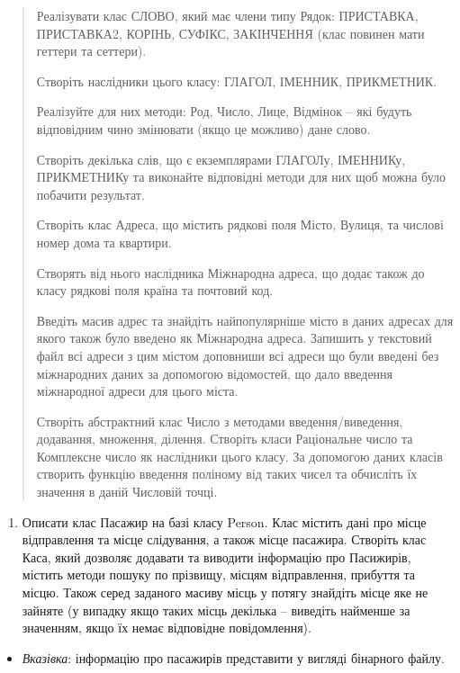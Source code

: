\documentclass[]{article}
\begin{document}
\begin{quote}
\protect\hypertarget{_Hlk65951544}{}{}Реалізувати клас СЛОВО, який має
члени типу Рядок: ПРИСТАВКА, ПРИСТАВКА2, КОРІНЬ, СУФІКС, ЗАКІНЧЕННЯ
(клас повинен мати геттери та сеттери).

Створіть наслідники цього класу: ГЛАГОЛ, ІМЕННИК, ПРИКМЕТНИК.

Реалізуйте для них методи: Род, Число, Лице, Відмінок -- які будуть
відповідним чино змінювати (якщо це можливо) дане слово.

Створіть декілька слів, що є екземплярами ГЛАГОЛу, ІМЕННИКу, ПРИКМЕТНИКу
та виконайте відповідні методи для них щоб можна було побачити
результат.

Створіть клас Адреса, що містить рядкові поля Місто, Вулиця, та числові
номер дома та квартири.

Створять від нього наслідника Міжнародна адреса, що додає також до класу
рядкові поля країна та почтовий код.

Введіть масив адрес та знайдіть найпопулярніше місто в даних адресах для
якого також було введено як Міжнародна адреса. Запишить у текстовий файл
всі адреси з цим містом доповниши всі адреси що були введені без
міжнародних даних за допомогою відомостей, що дало введення міжнародної
адреси для цього міста.

Створіть абстрактний клас Число з методами введення/виведення,
додавання, множення, ділення. Створіть класи Раціональне число та
Комплексне число як наслідники цього класу. За допомогою даних класів
створить функцію введення поліному від таких чисел та обчисліть їх
значення в даній Числовій точці.
\end{quote}

\begin{enumerate}
\def\labelenumi{\arabic{enumi}.}
\item
  Описати клас Пасажир на базі класу Person. Клас містить дані про місце
  відправлення та місце слідування, а також місце пасажира. Створіть
  клас Каса, який дозволяє додавати та виводити інформацію про
  Пасижирів, містить методи пошуку по прізвищу, місцям відправлення,
  прибуття та місцю. Також серед заданого масиву місць у потягу знайдіть
  місце яке не зайняте (у випадку якщо таких місць декілька -- виведіть
  найменше за значенням, якщо їх немає відповідне повідомлення).
\end{enumerate}

\begin{itemize}
\item
  \emph{Вказівка}: інформацію про пасажирів представити у вигляді
  бінарного файлу.
\end{itemize}
\end{document}
